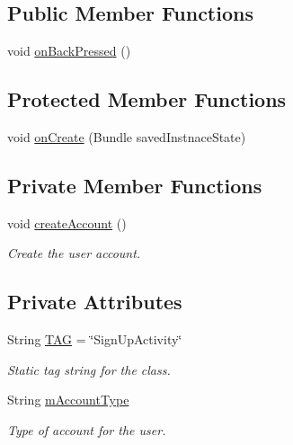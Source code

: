 \subsection*{Public Member Functions}
\begin{DoxyCompactItemize}
\item 
void \hyperlink{classuk_1_1ac_1_1swan_1_1digitaltrails_1_1accounts_1_1_sign_up_activity_aad14c8dfbeda1c7f055a8fb5dde7aa32}{on\+Back\+Pressed} ()
\end{DoxyCompactItemize}
\subsection*{Protected Member Functions}
\begin{DoxyCompactItemize}
\item 
void \hyperlink{classuk_1_1ac_1_1swan_1_1digitaltrails_1_1accounts_1_1_sign_up_activity_abdb5e9c3bc4c380148243c53deec8ef8}{on\+Create} (Bundle saved\+Instnace\+State)
\end{DoxyCompactItemize}
\subsection*{Private Member Functions}
\begin{DoxyCompactItemize}
\item 
void \hyperlink{classuk_1_1ac_1_1swan_1_1digitaltrails_1_1accounts_1_1_sign_up_activity_a38cadd884d54bdee13437bf9db879a65}{create\+Account} ()
\begin{DoxyCompactList}\small\item\em Create the user account. \end{DoxyCompactList}\end{DoxyCompactItemize}
\subsection*{Private Attributes}
\begin{DoxyCompactItemize}
\item 
String \hyperlink{classuk_1_1ac_1_1swan_1_1digitaltrails_1_1accounts_1_1_sign_up_activity_a69045d7b89a533e2e196e696dce43445}{T\+A\+G} = \char`\"{}Sign\+Up\+Activity\char`\"{}
\begin{DoxyCompactList}\small\item\em Static tag string for the class. \end{DoxyCompactList}\item 
String \hyperlink{classuk_1_1ac_1_1swan_1_1digitaltrails_1_1accounts_1_1_sign_up_activity_a7a7036d42bd7e430137fc06e363bec0a}{m\+Account\+Type}
\begin{DoxyCompactList}\small\item\em Type of account for the user. \end{DoxyCompactList}\end{DoxyCompactItemize}


